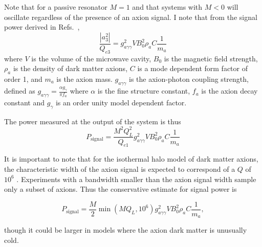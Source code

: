 \documentclass[aps,prl,twocolumn,groupedaddress]{revtex4-1}
\begin{document}
Note that for a passive resonator $M=1$ and that systems with $M<0$ will oscillate regardless of the presence of an axion signal. 
I note that from the signal power derived in Refs.~\cite{Cavity_idea_2,PhysRevLett.80.2043},
\begin{equation}
\frac{|a_3^2|}{Q_{e3}}=g_{a\gamma\gamma}^2VB_0^2\rho_aC\frac{1}{m_a}
\end{equation}
where $V$ is the volume of the microwave cavity, $B_0$ is the magnetic field strength, $\rho_a$ is the density of dark matter axions, $C$ is a mode dependent form factor of order 1, and $m_a$ is the axion mass.  
$g_{a\gamma\gamma}$ is the axion-photon coupling strength, defined as $g_{a\gamma\gamma}=\frac{\alpha g_\gamma}{\pi f_a}$ where $\alpha$ is the fine structure constant, $f_a$ is the axion decay constant and $g_\gamma$ is an order unity model dependent factor.

 The power measured at the output of the system is thus
\begin{equation}
\label{eqn:rawsig}
P_{\mathrm{signal}}=\frac{M^2Q_L^2}{Q_{e1}}g_{a\gamma\gamma}^2VB_0^2\rho_aC\frac{1}{m_a}
\end{equation}

It is important to note that for the isothermal halo model of dark matter axions,  the characteristic width of the axion signal is expected to correspond of a $Q$ of $10^6$ \cite{Cavity_idea}.   Experiments with a bandwidth smaller than the axion signal width sample only a subset of axions.  Thus the conservative estimate for signal power is

\begin{equation}
\label{eqn:sig}
P_{\mathrm{signal}}=\frac{M}{2}\min\left(MQ_L,10^6\right)g_{a\gamma\gamma}^2VB_0^2\rho_aC\frac{1}{m_a},
\end{equation}

though it could be larger in models where the axion dark matter is unusually cold.

\end{document}
